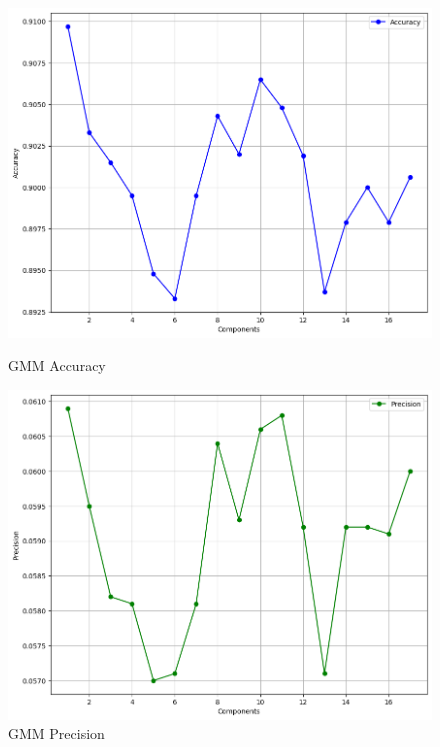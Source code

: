 \begin{figure}[H] %
    \begin{minipage}[t]{0.5\textwidth}
        \vspace{0pt}
        \includegraphics[width=\textwidth]{images/gmm-accuracy.png}
        \caption{GMM Accuracy}
    \end{minipage}
    \hfill
    \begin{minipage}[t]{0.5\textwidth}
        \vspace{0pt}
        \includegraphics[width=\textwidth]{images/gmm-precision.png}
        \caption{GMM Precision}
    \end{minipage}

\end{figure}
